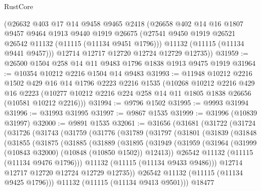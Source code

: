 \begin{lexlean}{RustCore}
\begin{coremodule}
      (@26632
        @403
        @17
        @14
        @9458
        @9465
        @2418
        (@26658
          @402
          @14
          @16
          @1807
          @9457
          @9464
          @1913
          @9440
          @1919
          @26675
          (@27541 @9450 @1919 @26521 @26542 @11132 (@11115 (@11134 @9451 @1796)))
          @11132
          (@11115 (@11134 @9441 @9457)))
        @12714
        @12717
        @12720
        @12724
        @12729
        @12735))
@31959 := @26500 @1504 @258 @14 @11 @9483 @1796 @1838 @1913 @9475 @1919
@31964 := @10354 @10212 @2216 @1504 @14 @9483
@31993 := @11948
    @10212
    @2216
    @1502
    @429
    @16
    @14
    @1796
    @2223
    @2216
    @1535
    (@10268
      @10212
      @2216
      @429
      @16
      @2223
      (@10277 @10212 @2216 @224 @258 @14 @11 @1805 @1838 @26656 (@10581 @10212 @2216)))
@31994 := @9796 @1502
@31995 := @9993 @31994
@31996 := @31993 @31995
@31997 := @9867 @1535
@31999 := @31996 (@10839 @31997)
@32000 := @9891 @1535
@32061 := @31656
    (@31681
      (@31722
        (@31724
          (@31726
            (@31743
              (@31759
                (@31776
                  (@31789
                    (@31797
                      (@31801
                        (@31839
                          (@31848
                            (@31855
                              (@31875
                                (@31885
                                  (@31889
                                    (@31895
                                      (@31949
                                        (@31959
                                          (@31964
                                            (@31999 (@10843 @32000) (@10848 (@10850 @1502)) @12413))
                                          @26542
                                          @11132
                                          (@11115 (@11134 @9476 @1796)))
                                        @11132
                                        (@11115 (@11134 @9433 @9486)))
                                      @12714
                                      @12717
                                      @12720
                                      @12724
                                      @12729
                                      @12735))
                                  @26542
                                  @11132
                                  (@11115 (@11134 @9425 @1796)))
                                @11132
                                (@11115 (@11134 @9413 @9501)))
                              @18477

\end{coremodule}
\end{lexlean}
